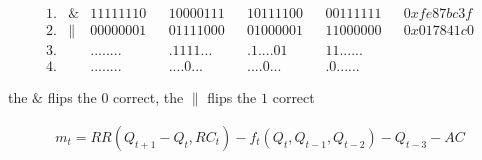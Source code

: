 \begin{align*}    
    1.& \& & 11111110 & & 10000111 & & 10111100 & & 00111111 & & 0xfe87bc3f \\
    2.& \| & 00000001 & & 01111000 & & 01000001 & & 11000000 & & 0x017841c0 \\
    3.&    & ........ & & .1111... & & .1....01 & & 11...... & &  \\
    4.&    & ........ & & ....0... & & ....0... & & .0...... & &  
\end{align*}

  the $\&$ flips the $0$ correct, the $\|$ flips the $1$ correct
\newpage


\begin{align*}
    m_t = RR \left( Q_{t+1} - Q_t , RC_t\right) - f_t \left( Q_t, Q_{t-1}, Q_{t-2} \right) - Q_{t-3} - AC
\end{align*}

